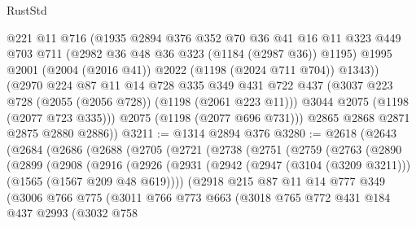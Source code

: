 \begin{lexlean}{RustStd}
\begin{coremodule}
            @221
            @11
            @716
            (@1935
              @2894
              @376
              @352
              @70
              @36
              @41
              @16
              @11
              @323
              @449
              @703
              @711
              (@2982 @36 @48 @36 @323 (@1184 (@2987 @36)) @1195)
              @1995
              @2001
              (@2004 (@2016 @41))
              @2022
              (@1198 (@2024 @711 @704))
              @1343))
          (@2970
            @224
            @87
            @11
            @14
            @728
            @335
            @349
            @431
            @722
            @437
            (@3037 @223 @728 (@2055 (@2056 @728)) (@1198 (@2061 @223 @11)))
            @3044
            @2075
            (@1198 (@2077 @723 @335)))
          @2075
          (@1198 (@2077 @696 @731)))
        @2865
        @2868
        @2871
        @2875
        @2880
        @2886))
@3211 := @1314 @2894 @376
@3280 := @2618
    (@2643
      (@2684
        (@2686
          (@2688
            (@2705
              (@2721
                (@2738
                  (@2751
                    (@2759
                      (@2763
                        (@2890
                          (@2899
                            (@2908
                              (@2916
                                (@2926
                                  (@2931
                                    (@2942
                                      (@2947 (@3104 (@3209 @3211)))
                                      (@1565 (@1567 @209 @48 @619))))
                                  (@2918
                                    @215
                                    @87
                                    @11
                                    @14
                                    @777
                                    @349
                                    (@3006
                                      @766
                                      @775
                                      (@3011
                                        @766
                                        @773
                                        @663
                                        (@3018
                                          @765
                                          @772
                                          @431
                                          @184
                                          @437
                                          @2993
                                          (@3032
                                            @758

\end{coremodule}
\end{lexlean}
